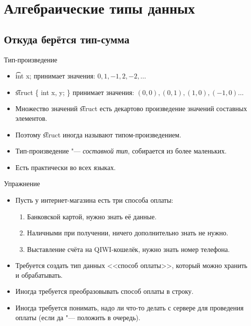 \section{Алгебраические типы данных}
\subsection{Откуда берётся тип-сумма}

\begin{frame}
\end{frame}

\begin{frame}{Тип-произведение}
	\begin{itemize}
		\item \t{int x;} принимает значения: $0, 1, -1, 2, -2, \dots$
		\item \t{struct \{ int x, y; \} } принимает значения: $(0, 0), (0, 1), (1, 0), (-1, 0) \dots$
		\item Множество значений \t{struct} есть декартово произведение значений составных элементов.
		\item Поэтому \t{struct} иногда называют типом-произведением.
		\item Тип-произведение "--- \textit{составной тип}, собирается из более маленьких.
		\item Есть практически во всех языках.
	\end{itemize}
\end{frame}

\begin{frame}{Упражнение}
	\begin{itemize}
		\item Пусть у интернет-магазина есть три способа оплаты:
			\begin{enumerate}
				\item Банковской картой, нужно знать её данные.
				\item Наличными при получении, ничего дополнительно знать не нужно.
				\item Выставление счёта на QIWI-кошелёк, нужно знать номер телефона.
			\end{enumerate}
		\item Требуется создать тип данных <<способ оплаты>>, который можно хранить и обрабатывать.
		\item Иногда требуется преобразовывать способ оплаты в строку.
		\item Иногда требуется понимать, надо ли что-то делать с сервере для проведения оплаты (если да "--- положить в очередь).
	\end{itemize}
\end{frame}

